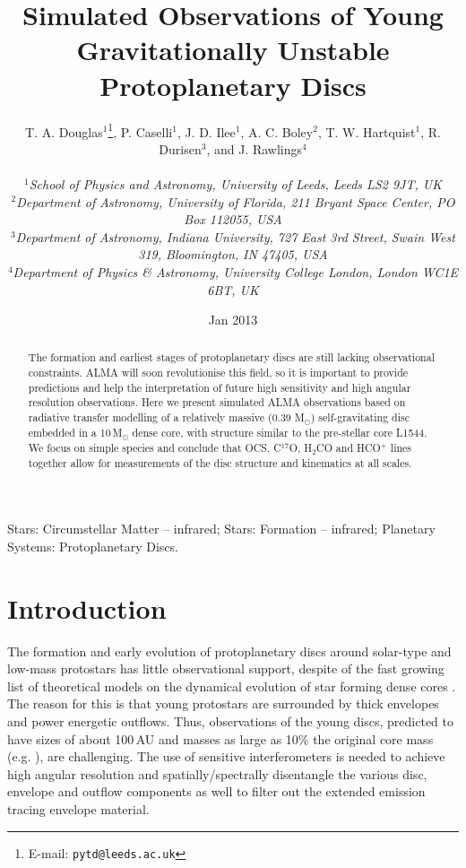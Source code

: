 \documentclass[useAMS,usenatbib]{mn2e}
\title[Young protoplanetary discs]{Simulated Observations of Young Gravitationally Unstable Protoplanetary Discs}
\author[T.~A.~Douglas et al.]
{\parbox{\textwidth}{T. A. Douglas$^{1}$\thanks{E-mail: \texttt{pytd@leeds.ac.uk}},
P. Caselli$^{1}$,
J. D. Ilee$^{1}$,
A. C. Boley$^{2}$,
T. W. Hartquist$^{1}$,
R. Durisen$^{3}$, and
J. Rawlings$^{4}$\\
\vspace{0.1cm}\\
{\small{\it$^{1}$School of Physics and Astronomy, University of Leeds, Leeds LS2 9JT, UK}} \\
{\small{\it$^{2}$Department of Astronomy, University of Florida, 211 Bryant Space Center, PO Box 112055, USA}}\\
{\small{\it$^{3}$Department of Astronomy, Indiana University, 727 East 3rd Street, Swain West 319, Bloomington, IN 47405, USA}}\\
{\small{\it$^{4}$Department of Physics \& Astronomy, University College London, London WC1E 6BT, UK}}\\}}
\begin{document}
\date{Jan 2013}

\pagerange{\pageref{firstpage}--\pageref{lastpage}} 

\maketitle

\label{firstpage}

\begin{abstract}
The formation and earliest stages of protoplanetary discs are still lacking observational constraints. ALMA will soon revolutionise this field, so it is important to provide predictions and help the interpretation of future high sensitivity and high angular resolution observations. Here we present simulated ALMA observations based on radiative transfer modelling of a relatively massive (0.39 M$_{\odot}$) self-gravitating disc embedded in a 10\,M$_{\odot}$ dense core, with structure similar to the pre-stellar core L1544. We focus on simple species and conclude that OCS, C$^{17}$O, H$_2$CO and HCO$^+$ lines together allow for measurements of the disc structure and kinematics at all scales. 
\end{abstract}

\begin{keywords}
Stars: Circumstellar Matter -- infrared; Stars: Formation -- infrared; Planetary Systems: Protoplanetary Discs.
\end{keywords}

\section{Introduction}

The formation and early evolution of protoplanetary discs around solar-type and low-mass protostars has little observational support, despite of the fast growing list of theoretical models on the dynamical evolution of star forming dense cores \citep[e.g.]{Krasnopolsky2011,Machida2011,Braiding2012,Joos2013}. The reason for this is that young protostars are surrounded by thick envelopes and power energetic outflows. Thus, observations of the young discs, predicted to have sizes of about 100\,AU and masses as large as 10\% the original core mass (e.g. \citealt{Joos2012}), are challenging. The use of sensitive interferometers is needed to achieve high angular resolution and spatially/spectrally disentangle the various disc, envelope and outflow components as well to filter out the extended emission tracing envelope material. \newline
\end{document}
